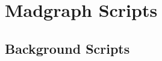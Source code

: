 \chapter{Madgraph Scripts}

\section{Background Scripts}

\begin{tcolorbox}[title=Background MadGraph Script]
    
\end{tcolorbox}
\lipsum